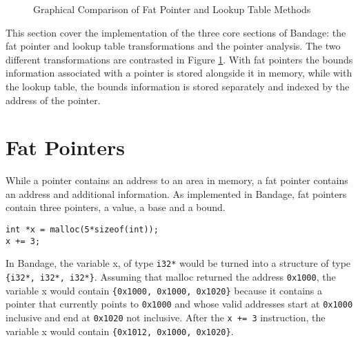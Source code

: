 \begin{figure}[h]
\caption{Graphical Comparison of Fat Pointer and Lookup Table Methods}
\label{fig:FatPointerAndTable}
\end{figure}

This section cover the implementation of the three core sections of Bandage: the fat pointer and lookup table transformations and the pointer analysis.
The two different transformations are contrasted in Figure \ref{fig:FatPointerAndTable}.
With fat pointers the bounds information associated with a pointer is stored alongside it in memory, while with the lookup table, the bounds information is stored separately and indexed by the address of the pointer.


\section{Fat Pointers}
While a pointer contains an address to an area in memory, a fat pointer contains an address and additional information.
As implemented in Bandage, fat pointers contain three pointers, a value, a base and a bound.

\begin{verbatim}
int *x = malloc(5*sizeof(int));
x += 3;
\end{verbatim}

In Bandage, the variable x, of type \verb!i32*! would be turned into a structure of type \verb!{i32*, i32*, i32*}!.
Assuming that malloc returned the address \verb!0x1000!, the variable x would contain \verb!{0x1000, 0x1000, 0x1020}! because it contains a pointer that currently points to \verb!0x1000! and whose valid addresses start at \verb!0x1000! inclusive and end at \verb!0x1020! not inclusive.
After the \verb!x += 3! instruction, the variable x would contain \verb!{0x1012, 0x1000, 0x1020}!.

